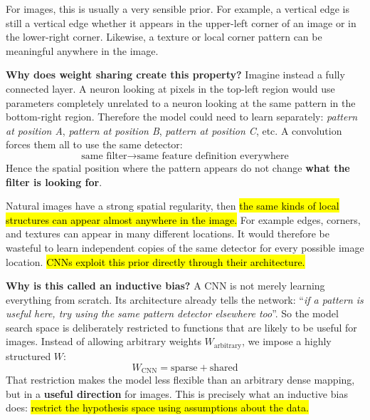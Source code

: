\highspace
For images, this is usually a very sensible prior. For example, a vertical edge is still a vertical edge whether it appears in the upper-left corner of an image or in the lower-right corner. Likewise, a texture or local corner pattern can be meaningful anywhere in the image.

\highspace
\textcolor{Green3}{ \textbf{Why does weight sharing create this property?}}
Imagine instead a fully connected layer. A neuron looking at pixels in the top-left region would use parameters completely unrelated to a neuron looking at the same pattern in the bottom-right region. Therefore the model could need to learn separately: \emph{pattern at position A}, \emph{pattern at position B}, \emph{pattern at position C}, etc. A convolution forces them all to use the same detector:
\begin{equation*}
    \text{same filter} \to \text{same feature definition everywhere}
\end{equation*}
Hence the spatial position where the pattern appears do not change \textbf{what the filter is looking for}.

\highspace
\textcolor{Green3}{} Natural images have a strong spatial regularity, then \hl{the same kinds of local structures can appear almost anywhere in the image.} For example edges, corners, and textures can appear in many different locations. It would therefore be wasteful to learn independent copies of the same detector for every possible image location. \hl{CNNs exploit this prior directly through their architecture.}

\highspace
\textcolor{Green3}{ \textbf{Why is this called an inductive bias?}} A CNN is not merely learning everything from scratch. Its architecture already tells the network: ``\emph{if a pattern is useful here, try using the same pattern detector elsewhere too}''. So the model search space is deliberately restricted to functions that are likely to be useful for images. Instead of allowing arbitrary weights $W_{\text{arbitrary}}$, we impose a highly structured $W$:
\begin{equation*}
    W_{\text{CNN}} = \text{sparse} + \text{shared}
\end{equation*}
That restriction makes the model less flexible than an arbitrary dense mapping, but in a \textbf{useful direction} for images. This is precisely what an inductive bias does: \hl{restrict the hypothesis space using assumptions about the data.}

